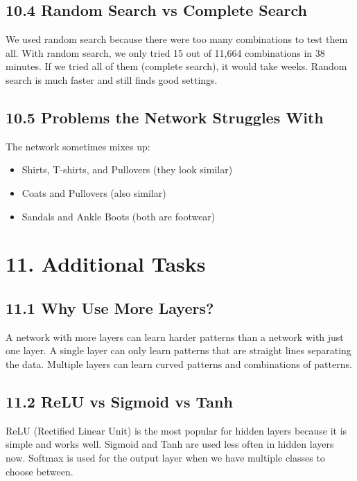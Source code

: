 \documentclass[11pt]{article}
\begin{document}
\subsection*{10.4 Random Search vs Complete Search}

We used random search because there were too many combinations to test them all. With random search, we only tried 15 out of 11,664 combinations in 38 minutes. If we tried all of them (complete search), it would take weeks. Random search is much faster and still finds good settings.

\subsection*{10.5 Problems the Network Struggles With}

The network sometimes mixes up:
\begin{itemize}[leftmargin=*]
\item Shirts, T-shirts, and Pullovers (they look similar)
\item Coats and Pullovers (also similar)
\item Sandals and Ankle Boots (both are footwear)
\end{itemize}

\section*{11. Additional Tasks}

\subsection*{11.1 Why Use More Layers?}

A network with more layers can learn harder patterns than a network with just one layer. A single layer can only learn patterns that are straight lines separating the data. Multiple layers can learn curved patterns and combinations of patterns.

\subsection*{11.2 ReLU vs Sigmoid vs Tanh}

ReLU (Rectified Linear Unit) is the most popular for hidden layers because it is simple and works well. Sigmoid and Tanh are used less often in hidden layers now. Softmax is used for the output layer when we have multiple classes to choose between.
\end{document}
